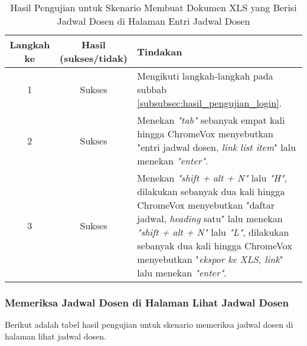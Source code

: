 \begin{table}[H]
    \centering 
    \caption{Hasil Pengujian untuk Skenario Membuat Dokumen XLS yang Berisi Jadwal Dosen di Halaman Entri Jadwal Dosen}
    \label{tab:hasil_pengujian_membuat_dokumen_xls_yang_berisi_jadwal_dosen_di_halaman_entri_jadwal_dosen}
    \begin{tabular}{|c|c|p{10cm}|}
        \toprule
        Langkah ke & Hasil (sukses/tidak) & Tindakan \\

        \midrule
        1 & Sukses & Mengikuti langkah-langkah pada subbab \ref{subsubsec:hasil_pengujian_login}. \\
        2 & Sukses & Menekan \textit{"tab"} sebanyak empat kali hingga ChromeVox menyebutkan "entri jadwal dosen, \textit{link list item}" lalu menekan \textit{"enter"}. \\
        3 & Sukses & Menekan \textit{"shift + alt + N"} lalu \textit{"H"}, dilakukan sebanyak dua kali hingga ChromeVox menyebutkan "daftar jadwal, \textit{heading} satu" lalu menekan \textit{"shift + alt + N"} lalu \textit{"L"}, dilakukan sebanyak dua kali hingga ChromeVox menyebutkan "\textit{ekspor ke XLS, link}" lalu menekan \textit{"enter"}. \\

        \bottomrule

    \end{tabular}
\end{table}

\subsubsection{Memeriksa Jadwal Dosen di Halaman Lihat Jadwal Dosen}
\label{subsubsec:hasil_pengujian_memeriksa_jadwal_dosen_di_halaman_lihat_jadwal_dosen}
Berikut adalah tabel hasil pengujian untuk skenario memeriksa jadwal dosen di halaman lihat jadwal dosen.

